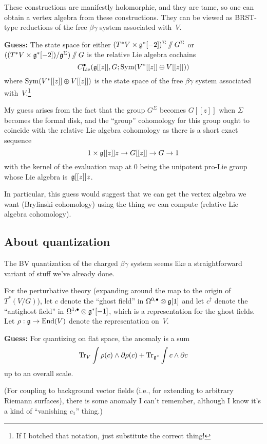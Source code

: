 \documentclass[11pt]{amsart}
\newcommand{\clie}{C^\bu_{\rm Lie}}
\begin{document}
These constructions are manifestly holomorphic, 
and they are tame,
so one can obtain a vertex algebra from these constructions.
They can be viewed as BRST-type reductions of the free $\beta\gamma$ system associated with~$V$.

{\bf Guess:} The state space for either $(T^*V \times \mathfrak g^*[-2])^\Sigma \mathbin{/\mkern-6mu/} G^\Sigma$ or $((T^* V \times \mathfrak g^*[-2])/\mathfrak g^\Sigma)\mathbin{/\mkern-6mu/} G$ is the relative Lie algebra cochains
\[
\clie(\fg[[z]], G; \Sym(V^*[[z]] \oplus V[[z]]))
\]
where $\operatorname{Sym}(V^*[[z]] \oplus V[[z]])$ is the state space of the free $\beta\gamma$ system associated with~$V$.\footnote{If I botched that notation, just substitute the correct thing!}

My guess arises from the fact that the group $G^\Sigma$ becomes $G[[z]]$ when $\Sigma$ becomes the formal disk,
and the ``group'' cohomology for this group ought to coincide with the relative Lie algebra cohomology as there is a short exact sequence
\[
1 \times \mathfrak g[[z]]z \to G[[z]] \to G \to 1
\]
with the kernel of the evaluation map at 0 being the unipotent pro-Lie group whose Lie algebra is~$\mathfrak g[[z]]z$.

In particular, this guess would suggest that we can get the vertex algebra we want (Brylinski cohomology) using the thing we can compute (relative Lie algebra cohomology).

\subsection{About quantization}

The BV quantization of the charged $\beta\gamma$ system seems like a straightforward variant of stuff we've already done. 

For the perturbative theory (expanding around the map to the origin of $T^*(V/G)$), let $c$ denote the ``ghost field'' in $\Omega^{0,\bullet} \otimes \mathfrak g[1]$ and let $c^\dagger$ denote the ``antighost field'' in $\Omega^{1,\bullet} \otimes \mathfrak g^*[-1]$, 
which is a representation for the ghost fields.
Let $\rho: \mathfrak g \to {\rm End}(V)$ denote the representation on~$V$. 

{\bf Guess:} For quantizing on flat space, the anomaly is a sum 
\[
\operatorname{Tr}_V \int \rho(c) \wedge \partial \rho(c) + \operatorname{Tr}_{\mathfrak g^*} \int c \wedge \partial c
\]
up to an overall scale.

(For coupling to background vector fields (i.e., for extending to arbitrary Riemann surfaces), 
there is some anomaly I can't remember, although I know it's a kind of ``vanishing $c_1$'' thing.)
\end{document}
